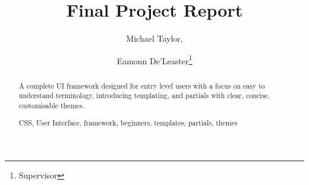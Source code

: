\documentclass[runningheads,a4paper]{llncs}
\newcommand{\keywords}[1]{\par\addvspace\baselineskip
\noindent\keywordname\enspace\ignorespaces#1}
\begin{document}
\mainmatter  %

\title{Final Project Report}


%
%
\author{Michael Taylor,%
\and Eamonn De'Leaster\thanks{Supervisor}}
%


%
%
\maketitle

%
\begin{abstract}

A complete UI framework designed for entry level users with a focus on easy to understand terminology, introducing templating, and partials with clear, concise, customisable themes.
\keywords{CSS, User Interface, framework, beginners, templates, partials, themes}
\end{abstract}
%

%
%
%
\newpage
\tableofcontents
%
\renewcommand*{\glsclearpage}{}
\end{document}
